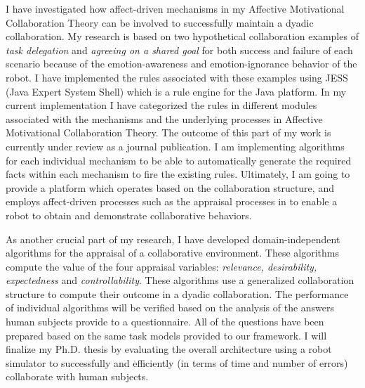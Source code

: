 \documentclass[a4paper, 11pt]{article}
\begin{document}
\begin{small}
I have investigated how affect-driven mechanisms in my Affective Motivational
Collaboration Theory can be involved to successfully maintain a dyadic
collaboration. My research is based on two hypothetical collaboration examples
of \textit{task delegation} and \textit{agreeing on a shared goal} for both
success and failure of each scenario because of the emotion-awareness and
emotion-ignorance behavior of the robot. I have implemented the rules associated
with these examples using JESS (Java Expert System Shell) which is a rule engine
for the Java platform. In my current implementation I have categorized the rules
in different modules associated with the mechanisms and the underlying processes
in Affective Motivational Collaboration Theory. The outcome of this part of my
work is currently under review as a journal publication. I am implementing
algorithms for each individual mechanism to be able to automatically generate
the required facts within each mechanism to fire the existing rules. Ultimately,
I am going to provide a platform which operates based on the collaboration
structure, and employs affect-driven processes such as the appraisal processes
in \cite{marsella:ema-process-model} to enable a robot to obtain and demonstrate
collaborative behaviors.


As another crucial part of my research, I have developed domain-independent
algorithms for the appraisal of a collaborative environment. These algorithms
compute the value of the four appraisal variables: \textit{relevance,
desirability, expectedness} and \textit{controllability}. These algorithms use a
generalized collaboration structure to compute their outcome in a dyadic
collaboration. The performance of individual algorithms will be verified based
on the analysis of the answers human subjects provide to a questionnaire. All
of the questions have been prepared based on the same task models provided to
our framework. I will finalize my Ph.D. thesis by evaluating the overall
architecture using a robot simulator to successfully and efficiently (in terms
of time and number of errors) collaborate with human subjects.
\vspace*{-5mm}

\end{small}
\end{document}
